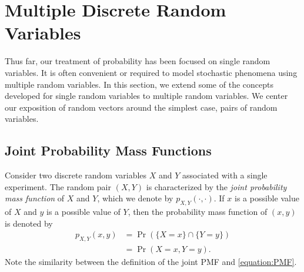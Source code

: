 \chapter[Discrete Random Vectors]{Multiple Discrete Random Variables}
\label{chapter:RandomVectorsDiscrete}

Thus far, our treatment of probability has been focused on single random variables.
It is often convenient or required to model stochastic phenomena using multiple random variables.
In this section, we extend some of the concepts developed for single random variables to multiple random variables.
We center our exposition of random vectors around the simplest case, pairs of random variables.


\section{Joint Probability Mass Functions}

Consider two discrete random variables $X$ and $Y$ associated with a single experiment.
The random pair $(X, Y)$ is characterized by the \emph{joint probability mass function} of $X$ and $Y$, which we denote by $p_{X,Y}(\cdot,\cdot)$. 
If $x$ is a possible value of $X$ and $y$ is a possible value of $Y$, then the probability mass function of $(x, y)$ is denoted by
\begin{equation*}
\begin{split}
p_{X,Y} (x, y) &= \Pr ( \{ X = x \} \cap \{ Y = y \} ) \\
&= \Pr ( X = x, Y = y ).
\end{split}
\end{equation*}
Note the similarity between the definition of the joint PMF and \eqref{equation:PMF}.

